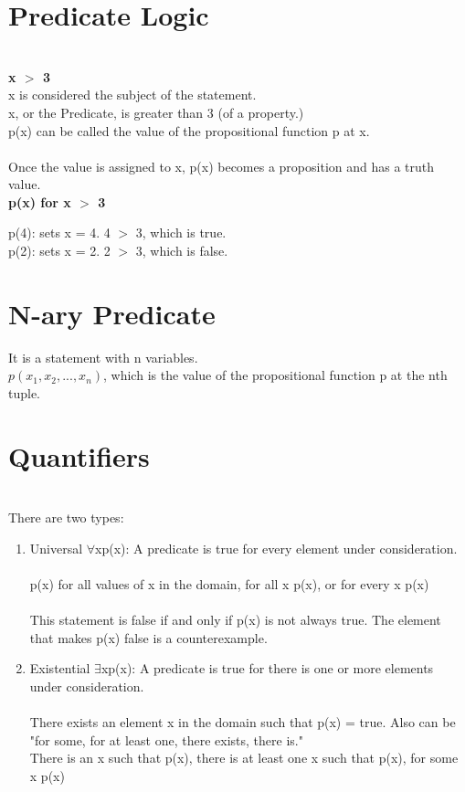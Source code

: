 \documentclass{article}
\begin{document}
\section{Predicate Logic}
\\

\textbf{x $>$ 3}
\\x is considered the subject of the statement.\\
x, or the Predicate, is greater than 3 (of a property.)\\
p(x) can be called the value of the propositional function p at x.\\
\\Once the value is assigned to x, p(x) becomes a proposition and has a truth value.\\

\textbf{p(x) for x $>$ 3}
\begin{center}
    p(4): sets x = 4. 4 $>$ 3, which is true.\\
    p(2): sets x = 2. 2 $>$ 3, which is false.
\end{center}

\section{N-ary Predicate}
It is a statement with n variables.\\$p(x_{1}, x_{2},...,x_{n})$, which is the value of the propositional function p at the nth tuple.

\section{Quantifiers}
\\

There are two types:
\begin{enumerate}
    \item
    Universal $\forall$xp(x): A predicate is true for every element under consideration.\\
    \\p(x) for all values of x in the domain, for all x p(x), or for every x p(x)\\
    \\This statement is false if and only if p(x) is not always true. The element that makes p(x) false 
    is a counterexample.

    \item
    Existential $\exists$xp(x): A predicate is true for there is one or more elements under consideration.\\
    \\There exists an element x in the domain such that p(x) = true. Also can be "for some, for at least one,
    there exists, there is."\\There is an x such that p(x), there is at least one x such that p(x), for some x p(x)
\end{enumerate}
\end{document}

